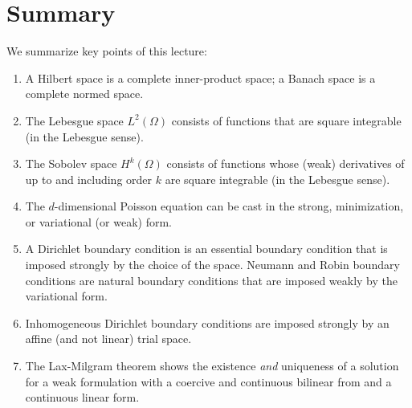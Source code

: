 \section{Summary}
We summarize key points of this lecture:
\begin{enumerate}
\item A Hilbert space is a complete inner-product space; a Banach space is a complete normed space.
\item The Lebesgue space $L^2(\Omega)$ consists of functions that are square integrable (in the Lebesgue sense).
\item The Sobolev space $H^k(\Omega)$ consists of functions whose (weak) derivatives of up to and including order $k$ are square integrable (in the Lebesgue sense).
\item The $d$-dimensional Poisson equation can be cast in the strong, minimization, or variational (or weak) form.
\item A Dirichlet boundary condition is an essential boundary condition that is imposed strongly by the choice of the space.  Neumann and Robin boundary conditions are natural boundary conditions that are imposed weakly by the variational form.
\item Inhomogeneous Dirichlet boundary conditions are imposed strongly by an affine (and not linear) trial space.
\item The Lax-Milgram theorem shows the existence \emph{and} uniqueness of a solution for a weak formulation with a coercive and continuous bilinear from and a continuous linear form.
\end{enumerate}



